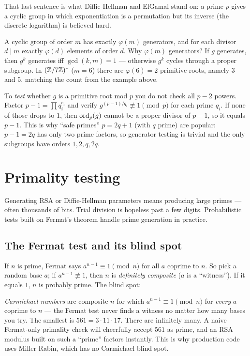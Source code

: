 That last sentence is what Diffie-Hellman and ElGamal stand on: a prime $p$ gives a cyclic group in
which exponentiation is a permutation but its inverse (the discrete logarithm) is believed hard.

\begin{whybox}
A cyclic group of order $m$ has exactly $\varphi(m)$ generators, and for each divisor $d\mid m$
exactly $\varphi(d)$ elements of order $d$. Why $\varphi(m)$ generators? If $g$ generates, then
$g^k$ generates iff $\gcd(k,m)=1$ --- otherwise $g^k$ cycles through a proper subgroup. In $(\mathbb{Z}/7\mathbb{Z})^{*}$
($m=6$) there are $\varphi(6)=2$ primitive roots, namely $3$ and $5$, matching the count from the
example above.
\end{whybox}

\begin{connectionbox}
To \emph{test} whether $g$ is a primitive root mod $p$ you do not check all $p-2$ powers. Factor
$p-1 = \prod q_i^{e_i}$ and verify $g^{(p-1)/q_i}\not\equiv 1\pmod p$ for each prime $q_i$. If none of
those drops to $1$, then $\operatorname{ord}_p(g)$ cannot be a proper divisor of $p-1$, so it equals $p-1$. This is
why ``safe primes'' $p = 2q+1$ (with $q$ prime) are popular: $p-1 = 2q$ has only two prime factors,
so generator testing is trivial and the only subgroups have orders $1,2,q,2q$.
\end{connectionbox}

\section{Primality testing}
\label{ch40:primality}

Generating RSA or Diffie-Hellman parameters means producing large primes --- often thousands of
bits. Trial division is hopeless past a few digits. Probabilistic tests built on Fermat's theorem
handle prime generation in practice.

\subsection{The Fermat test and its blind spot}
\label{ch40:fermat-test}

If $n$ is prime, Fermat says $a^{n-1}\equiv 1\pmod n$ for all $a$ coprime to $n$. So pick a random
base $a$; if $a^{n-1}\not\equiv 1$, then $n$ is \emph{definitely composite} ($a$ is a ``witness'').
If it equals $1$, $n$ is probably prime. The blind spot:

\begin{attackbox}
\emph{Carmichael numbers} are composite $n$ for which $a^{n-1}\equiv 1\pmod n$ for \emph{every} $a$
coprime to $n$ --- the Fermat test never finds a witness no matter how many bases you try. The
smallest is $561 = 3\cdot 11\cdot 17$. There are infinitely many. A naive Fermat-only primality
check will cheerfully accept $561$ as prime, and an RSA modulus built on such a ``prime'' factors
instantly. This is why production code uses Miller-Rabin, which has no Carmichael blind spot.
\end{attackbox}

